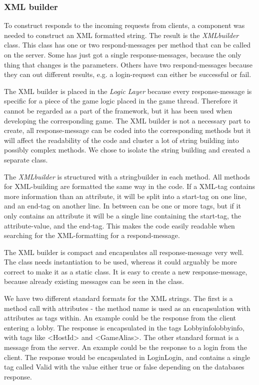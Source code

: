 \subsubsection{XML builder}
\label{sec:xmlbuilderimpl}
To construct responds to the incoming requests from clients, a component was needed to construct an XML formatted string. The result is the \textit{XMLbuilder} class. This class has one or two respond-messages per method that can be called on the server. Some has just got a single response-messages, because the only thing that changes is the parameters. Others have two respond-messages because they can out different results, e.g. a login-request can either be successful or fail. 

The XML builder is placed in the \textit{Logic Layer} because every response-message is specific for a piece of the game logic placed in the game thread. Therefore it cannot be regarded as a part of the framework, but it has been used when developing the corresponding game. The XML builder is not a necessary part to create, all response-message can be coded into the corresponding methods but it will affect the readability of the code and cluster a lot of string building into possibly complex methods. We chose to isolate the string building and created a separate class.

The \textit{XMLbuilder} is structured with a stringbuilder in each method. All methods for XML-building are formatted the same way in the code. If a XML-tag contains more information than an attribute, it will be split into a start-tag on one line, and an end-tag on another line. In between can be one or more tags, but if it only contains an attribute it will be a single line containing the start-tag, the attribute-value, and the end-tag. This makes the code easily readable when searching for the XML-formatting for a respond-message. 

The XML builder is compact and encapsulates all response-message very well. The class needs instantiation to be used, whereas it could arguably be more correct to make it as a static class. It is easy to create a new response-message, because already existing messages can be seen in the class.

We have two different standard formats for the XML strings. The first is a method call with attributes - the method name is used as an encapsulation with attributes as tags within. An example could be the response from the client entering a lobby. The response is encapsulated in the tags \<Lobbyinfo\>\<\/lobbyinfo\>, with tags like <HostId> and <GameAlias>. The other standard format is a message from the server. An example could be the response to a login from the client. The response would be encapsulated in \<Login\>\<\/Login\>, and contains a single tag called \<Valid\> with the value either true or false depending on the databases response.